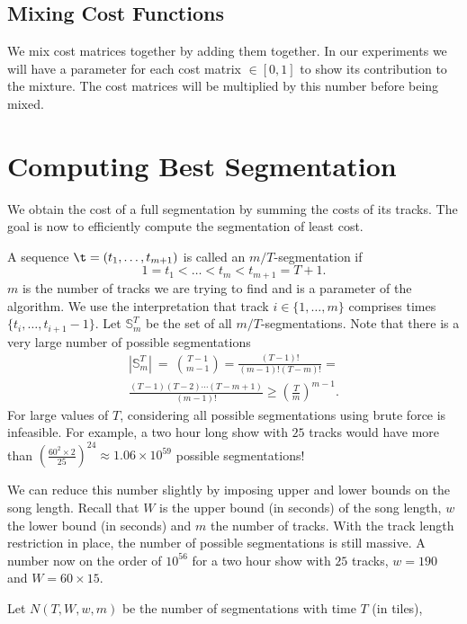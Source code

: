\documentclass[twocolumn]{article}
\newcommand{\segs}{\mathbb S}
\begin{document}
	\subsection{Mixing Cost Functions}
	
	We mix cost matrices together by adding them together. In our experiments we will have a parameter for each cost matrix $\in [0,1]$ to show its contribution to the mixture. The cost matrices will be multiplied by this number before being mixed. 
	
	\section{Computing Best Segmentation}\label{best_cost}
	
	We obtain the cost of a full segmentation by summing the costs of its tracks. The goal is now to efficiently compute the segmentation of least cost.
	
	A sequence $\t = (t_1, \ldots, t_{m+1})$ is called an $m/T$-segmentation if
	\[
	1 = t_1 < \ldots < t_m < t_{m+1} = T+1.
	\]
	$m$ is the number of tracks we are trying to find and is a parameter of the algorithm. We use the interpretation that track $i \in \{1, \ldots, m\}$ comprises times $\{t_i, \ldots, t_{i+1}-1\}$. Let $\segs^T_m$ be the set of all $m/T$-segmentations. Note that there is a very large number of possible segmentations 
	\begin{multline*}
		|\segs^T_m| ~=~ \binom{T-1}{m-1}
		= \frac{(T-1)!}{(m-1)!(T-m)!} =\\
		\frac{(T-1)(T-2)\cdots(T-m+1)}{(m-1)!} \ge \left( \frac{T}{m}\right)^{m-1}.
	\end{multline*} 
	For large values of $T$, considering all possible segmentations using brute force is infeasible. For example, a two hour long show with $25$ tracks would have more than $\left( \frac{60^2 \times 2}{25}\right)^{24}  \approx 1.06 \times 10^{59}$ possible segmentations! 
	
	We can reduce this number slightly by imposing upper and lower bounds on the song length.  Recall that $W$ is the upper bound (in seconds) of the song length, $w$ the lower bound (in seconds) and $m$ the number of tracks. With the track length restriction in place, the number of possible segmentations is still massive. A number now on the order of $10^{56}$ for a two hour show with $25$ tracks, $w=190$ and $W=60\times15$.
	
	
	
	Let $N(T,W,w,m)$ be the number of segmentations with time $T$ (in tiles),
	
\end{document}
